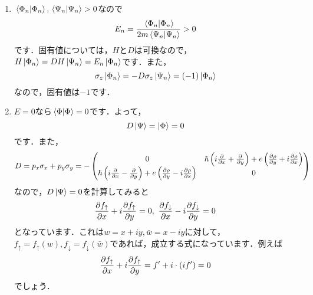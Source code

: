 \documentclass[a4paper,pdflatex,ja=standard]{bxjsarticle}
\begin{document}
\begin{enumerate}
  \item 
  $\ev*{\Phi_n|\Phi_n},\ev*{\Psi_n|\Psi_n}>0$なので
  \begin{equation}
    E_n
    =
    \frac{\ev*{\Phi_n|\Phi_n}}{2m\ev*{\Psi_n|\Psi_n}}
    >
    0
  \end{equation}
  です．固有値については，$H$と$D$は可換なので，$H\ket{\Phi_n}=DH\ket{\Psi_n}=E_n\ket{\Phi_n}$です．また，
  \begin{equation}
    \sigma_z \ket{\Phi_n}
    =
    -D\sigma_z\ket{\Psi_n}
    =
    (-1)\ket{\Phi_n}
  \end{equation}
  なので，固有値は$-1$です．

  \item 
  $E=0$なら$\ev*{\Phi|\Phi}=0$です．よって，
  \begin{equation}
    D\ket{\Psi}
    =
    \ket{\Phi}
    =
    0
  \end{equation}
  です．また，
  \begin{equation}
    D
    =
    p_x\sigma_x+p_y\sigma_y
    =
    -
    \begin{pmatrix}
     0 & \hbar\left( i\pdv{}{x}+\pdv{}{y} \right)+e\left( \pdv{\rho}{y}+i\pdv{\rho}{x} \right) \\
     \hbar\left( i\pdv{}{x}-\pdv{}{y} \right)+e\left( \pdv{\rho}{y}-i\pdv{\rho}{x} \right) & 0 \\
    \end{pmatrix}
  \end{equation}
  なので，$D\ket{\Psi}=0$を計算してみると
  \begin{equation}
    \pdv{f_{\uparrow}}{x}
    +
    i\pdv{f_{\uparrow}}{y}
    =
    0
    ,\ 
    \pdv{f_{\downarrow}}{x}
    -
    i\pdv{f_{\downarrow}}{y}
    =
    0
  \end{equation}
  となっています．これは$w=x+iy,\bar{w}=x-iy$に対して，$f_{\uparrow}=f_{\uparrow}(w),f_{\downarrow}=f_{\downarrow}(\bar{w})$であれば，成立する式になっています．例えば
  \begin{equation}
    \pdv{f_{\uparrow}}{x}
    +
    i\pdv{f_{\uparrow}}{y}
    =
    f'+i\cdot(if')
    =
    0
  \end{equation}
  でしょう．


\end{enumerate}
\end{document}
